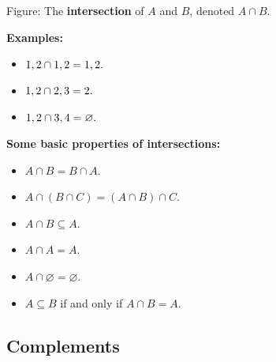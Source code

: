 


Figure: The \textbf{intersection} of $A$ and $B$, denoted $A \cap B$.



\textbf{Examples:}



\begin{itemize}
    \item $\\{1, 2\\} \cap \\{1, 2\\} = \\{1, 2\\}.$
    \item $\\{1, 2\\} \cap \\{2, 3\\} = \\{2\\}.$
    \item $\\{1, 2\\} \cap \\{3, 4\\} = \varnothing.$
\end{itemize}

\textbf{Some basic properties of intersections:}



\begin{itemize}
    \item $A \cap B = B \cap A.$
    \item $A \cap (B \cap C) = (A \cap B) \cap C.$
    \item $A \cap B \subseteq A.$
    \item $A \cap A = A.$
    \item $A \cap \varnothing = \varnothing.$
    \item $A \subseteq B$ if and only if $A \cap B = A$.
\end{itemize}


\subsection{Complements}
\label{sss:comp-5a11}




